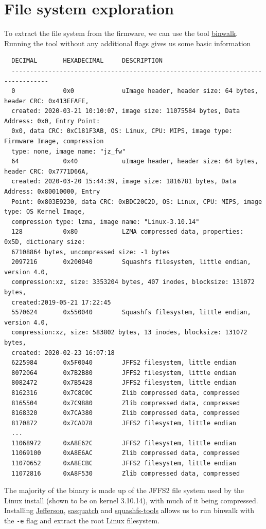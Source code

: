\documentclass[a4paper, 11pt]{article}
\begin{document}
\section{File system exploration}
To extract the file system from the firmware, we can use the tool \href{https://github.com/ReFirmLabs/binwalk}{binwalk}. Running the tool without any additional flags gives us some basic information
\begin{verbatim}
  DECIMAL       HEXADECIMAL     DESCRIPTION
  --------------------------------------------------------------------------------
  0             0x0             uImage header, header size: 64 bytes, header CRC: 0x413EFAFE,
  created: 2020-03-21 10:10:07, image size: 11075584 bytes, Data Address: 0x0, Entry Point:
  0x0, data CRC: 0xC181F3AB, OS: Linux, CPU: MIPS, image type: Firmware Image, compression 
  type: none, image name: "jz_fw"
  64            0x40            uImage header, header size: 64 bytes, header CRC: 0x7771D66A,
  created: 2020-03-20 15:44:39, image size: 1816781 bytes, Data Address: 0x80010000, Entry
  Point: 0x803E9230, data CRC: 0xBDC20C2D, OS: Linux, CPU: MIPS, image type: OS Kernel Image,
  compression type: lzma, image name: "Linux-3.10.14"
  128           0x80            LZMA compressed data, properties: 0x5D, dictionary size:
  67108864 bytes, uncompressed size: -1 bytes
  2097216       0x200040        Squashfs filesystem, little endian, version 4.0,
  compression:xz, size: 3353204 bytes, 407 inodes, blocksize: 131072 bytes,
  created:2019-05-21 17:22:45
  5570624       0x550040        Squashfs filesystem, little endian, version 4.0,
  compression:xz, size: 583802 bytes, 13 inodes, blocksize: 131072 bytes,
  created: 2020-02-23 16:07:18
  6225984       0x5F0040        JFFS2 filesystem, little endian
  8072064       0x7B2B80        JFFS2 filesystem, little endian
  8082472       0x7B5428        JFFS2 filesystem, little endian
  8162316       0x7C8C0C        Zlib compressed data, compressed
  8165504       0x7C9880        Zlib compressed data, compressed
  8168320       0x7CA380        Zlib compressed data, compressed
  8170872       0x7CAD78        JFFS2 filesystem, little endian
  ...
  11068972      0xA8E62C        JFFS2 filesystem, little endian
  11069100      0xA8E6AC        Zlib compressed data, compressed
  11070652      0xA8ECBC        JFFS2 filesystem, little endian
  11072816      0xA8F530        Zlib compressed data, compressed
\end{verbatim}
The majority of the binary is made up of the JFFS2 file system used by the Linux install (shown to be on kernel 3.10.14), with much of it being compressed. Installing \href{https://github.com/onekey-sec/jefferson/}{Jefferson}, \href{https://github.com/devttys0/sasquatch}{sasquatch} and \href{https://github.com/plougher/squashfs-tools}{squashfs-tools} allows us to run binwalk with the \verb|-e| flag and extract the root Linux filesystem.
\end{document}
